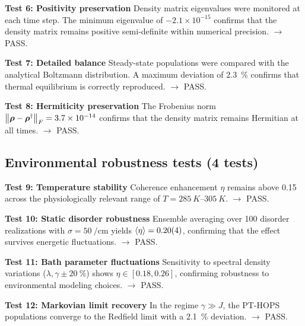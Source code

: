 \documentclass[11pt,a4paper]{article}
\begin{document}
\textbf{Test 6: Positivity preservation}
\label{test:positivity_preservation}
Density matrix eigenvalues were monitored at each time step. The minimum eigenvalue of $-2.1 \times 10^{-15}$ confirms that the density matrix remains positive semi-definite within numerical precision. $\rightarrow$ PASS.

\textbf{Test 7: Detailed balance}
\label{test:detailed_balance}
Steady-state populations were compared with the analytical Boltzmann distribution. A maximum deviation of \SI{2.3}{\percent} confirms that thermal equilibrium is correctly reproduced. $\rightarrow$ PASS.

\textbf{Test 8: Hermiticity preservation}
\label{test:hermiticity_preservation}
The Frobenius norm $\norm{\vb*{\rho} - \vb*{\rho}^\dagger}_F = 3.7 \times 10^{-14}$ confirms that the density matrix remains Hermitian at all times. $\rightarrow$ PASS.

\subsection{Environmental robustness tests (4 tests)}
\label{ssec:environmental_robustness_tests}\textbf{Test 9: Temperature stability}
Coherence enhancement $\eta$ remains above 0.15 across the physiologically relevant range of $T = \SIrange{285}{305}{K}$. $\rightarrow$ PASS.

\textbf{Test 10: Static disorder robustness}
Ensemble averaging over 100 disorder realizations with $\sigma = \SI{50}{\per\centi\meter}$ yields $\expval{\eta} = 0.20(4)$, confirming that the effect survives energetic fluctuations. $\rightarrow$ PASS.

\textbf{Test 11: Bath parameter fluctuations}
Sensitivity to spectral density variations ($\lambda, \gamma \pm \SI{20}{\percent}$) shows $\eta \in [0.18, 0.26]$, confirming robustness to environmental modeling choices. $\rightarrow$ PASS.

\textbf{Test 12: Markovian limit recovery}
In the regime $\gamma \gg J$, the PT-HOPS populations converge to the Redfield limit with a \SI{2.1}{\percent} deviation. $\rightarrow$ PASS.
\end{document}
